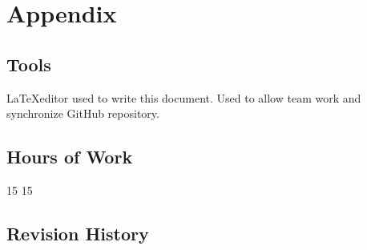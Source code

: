 \section{Appendix}
\subsection{Tools}
\begin{itemize}
	 \LaTeX editor used to write this document.
	 Used to allow team work and synchronize GitHub repository.
\end{itemize}
\subsection{Hours of Work}
\begin{itemize}
	 15
	 15
\end{itemize}
\subsection{Revision History}
